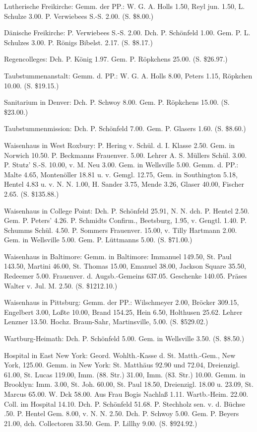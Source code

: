 Lutherische Freikirche: Gemm. der PP.: W. G. A. Holls 1.50, Reyl jun. 1.50, L. Schulze 3.00. P. Verwiebees S.-S. 2.00. (S. \$8.00.)

Dänische Freikirche: P. Verwiebees S.-S. 2.00. Dch. P. Schönfeld 1.00. Gem. P. L. Schulzes 3.00. P. Rönigs Bibelst. 2.17. (S. \$8.17.)

Regencolleges: Dch. P. König 1.97. Gem. P. Röpkchens 25.00. (S. \$26.97.)

Taubstummenanstalt: Gemm. d. PP.: W. G. A. Holls 8.00, Peters 1.15, Röpkchen 10.00. (S. \$19.15.)

Sanitarium in Denver: Dch. P. Schwoy 8.00. Gem. P. Röpkchens 15.00. (S. \$23.00.)

Taubstummenmission: Dch. P. Schönfeld 7.00. Gem. P. Glasers 1.60. (S. \$8.60.)

Waisenhaus in West Roxbury: P. Hering v. Schül. d. I. Klasse 2.50. Gem. in Norwich 10.50. P. Beckmanns Frauenver. 5.00. Lehrer A. S. Müllers Schül. 3.00. P. Stutz’ S.-S. 10.00, v. M. Neu 3.00. Gem. in Wellsville 5.00. Gemm. d. PP.: Malte 4.65, Montenöller 18.81 u. v. Gemgl. 12.75, Gem. in Southington 5.18, Hentel 4.83 u. v. N. N. 1.00, H. Sander 3.75, Mende 3.26, Glaser 40.00, Fischer 2.65. (S. \$135.88.)

Waisenhaus in College Point: Dch. P. Schönfeld 25.91, N. N. dch. P. Hentel 2.50. Gem. P. Peters’ 4.26. P. Schmidts Confirm., Beetsburg, 1.95, v. Gengtl. 1.40. P. Schumms Schül. 4.50. P. Sommers Frauenver. 15.00, v. Tilly Hartmann 2.00. Gem. in Wellsville 5.00. Gem. P. Lüttmanns 5.00. (S. \$71.00.)

Waisenhaus in Baltimore: Gemm. in Baltimore: Immanuel 149.50, St. Paul 143.50, Martini 46.00, St. Thomas 15.00, Emanuel 38.00, Jackson Square 35.50, Redeemer 5.00. Frauenver. d. Augsb.-Gemeins 637.05. Geschenke 140.05. Präses Walter v. Jul. M. 2.50. (S. \$1212.10.)

Waisenhaus in Pittsburg: Gemm. der PP.: Wilschmeyer 2.00, Bröcker 309.15, Engelbert 3.00, Loßte 10.00, Brand 154.25, Hein 6.50, Holthusen 25.62. Lehrer Lenzner 13.50. Hochz. Braun-Sahr, Martinsville, 5.00. (S. \$529.02.)

Wartburg-Heimath: Dch. P. Schönfeld 5.00. Gem. in Wellsville 3.50. (S. \$8.50.)

Hospital in East New York: Geord. Wohlth.-Kasse d. St. Matth.-Gem., New York, 125.00. Gemm. in New York: St. Matthäus 92.90 und 72.04, Dreienzigl. 61.00, St. Lucas 119.00, Imm. (88. Str.) 31.00, Imm. (83. Str.) 10.00. Gemm. in Brooklyn: Imm. 3.00, St. Joh. 60.00, St. Paul 18.50, Dreienzigl. 18.00 u. 23.09, St. Marcus 65.00. W. Dck 58.00. Aus Frau Bogis Nachlaß 1.11. Wartb.-Heim. 22.00. Coll. im Hospital 14.10. Dch. P. Schönfeld 51.68. P. Stechholz sen. v. d. Büchse .50. P. Hentel Gem. 8.00, v. N. N. 2.50. Dch. P. Schwoy 5.00. Gem. P. Beyers 21.00, dch. Collectoren 33.50. Gem. P. Lillhy 9.00. (S. \$924.92.)

